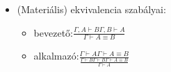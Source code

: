 \begin{definition}
\begin{itemize}
\begin{itemize}
\begin{itemize}
		\end{itemize}
		\item (Materiális) ekvivalencia szabályai:
		\begin{itemize}
			\item bevezető:$\frac{\Gamma,A\vdash B \Gamma,B\vdash A}{\Gamma\vdash A\equiv B}$
			\item alkalmazó:$\frac{\Gamma\vdash A \Gamma\vdash A\equiv B}{\frac{\Gamma\vdash B \Gamma\vdash B \Gamma\vdash A \equiv B}{\Gamma\vdash A}}$
		\end{itemize}
	\end{itemize}
\end{itemize}
\end{definition}


